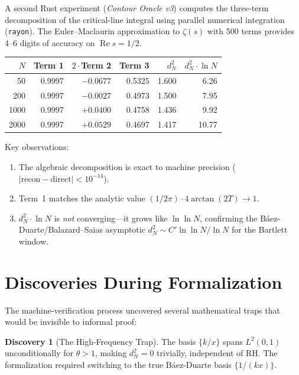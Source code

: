 \documentclass[11pt,a4paper]{article}
\theoremstyle{definition}
\newtheorem{discovery}[definition]{Discovery}
\newcommand{\re}{\operatorname{Re}}
\begin{document}
A second Rust experiment (\emph{Contour Oracle v3}) computes the three-term
decomposition of the critical-line integral using parallel numerical
integration (\texttt{rayon}). The Euler--Maclaurin approximation to
$\zeta(s)$ with 500 terms provides 4--6 digits of accuracy on $\re s = 1/2$.

\begin{center}
\begin{tabular}{@{}rrrrrr@{}}
\toprule
$N$ & Term 1 & $2\cdot$Term 2 & Term 3 & $d_N^2$ & $d_N^2 \cdot \ln N$ \\
\midrule
50  & 0.9997 & $-0.0677$ & 0.5325 & 1.600 & 6.26  \\
200 & 0.9997 & $-0.0027$ & 0.4973 & 1.500 & 7.95  \\
1000 & 0.9997 & $+0.0400$ & 0.4758 & 1.436 & 9.92 \\
2000 & 0.9997 & $+0.0529$ & 0.4697 & 1.417 & 10.77 \\
\bottomrule
\end{tabular}
\end{center}

\noindent Key observations:
\begin{enumerate}
  \item The algebraic decomposition is exact to machine precision
    ($|\text{recon} - \text{direct}| < 10^{-14}$).
  \item Term~1 matches the analytic value
    $(1/2\pi)\cdot 4\arctan(2T) \to 1$.
  \item $d_N^2 \cdot \ln N$ is \emph{not} converging---it grows like
    $\ln\ln N$, confirming the B\'aez-Duarte/Balazard--Saias asymptotic
    $d_N^2 \sim C' \ln\ln N / \ln N$ for the Bartlett window.
\end{enumerate}

\section{Discoveries During Formalization}

The machine-verification process uncovered several mathematical traps
that would be invisible to informal proof:

\begin{discovery}[The High-Frequency Trap]
The basis $\{k/x\}$ spans $L^2(0,1)$ unconditionally for $\theta > 1$,
making $d_N^2 = 0$ trivially, independent of RH. The formalization
required switching to the true B\'aez-Duarte basis $\{1/(kx)\}$.
\end{discovery}
\end{document}
